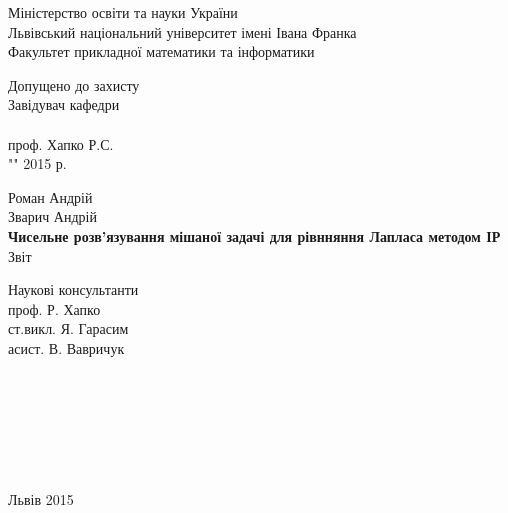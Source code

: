 \documentclass[a4 paper,12pt,ukrainian]{report}
\begin{document}
\titlepage
\begin{center}
\large {Міністерство освіти та науки України}\\
\large {Львівський національний університет імені Івана Франка}\\
\large {Факультет прикладної математики та інформатики}\\
\end{center}

\normalsize \vspace*{2cm}
\hspace*{11cm}Допущено до захисту\\
\hspace*{11cm}Завідувач кафедри\\
\hspace*{11cm}\underline{\hspace{3cm}}\\
\hspace*{11cm}проф. Хапко Р.С.\\
\hspace*{11cm}"\underline{\hspace{0.5cm}}"\underline{\hspace{2cm}} 2015 р.
\normalsize \vspace*{2cm}
\begin{center}
\large{Роман Андрій}\\
\large{Зварич Андрій}\\
\large{\textbf{Чисельне розв'язування мішаної задачі для рівнняння Лапласа методом ІР}}\\
\large{Звіт}\\
\end{center}
\normalsize \vspace*{3cm}
\hspace*{11cm}Наукові консультанти\\
\hspace*{11cm}проф. Р. Хапко\\
\hspace*{11cm}ст.викл. Я. Гарасим\\
\hspace*{11cm}асист. В. Вавричук\\
\\
\\
\\
\\
\\
\\
\large\centerline{Львів 2015}
\tableofcontents
\end{document}
